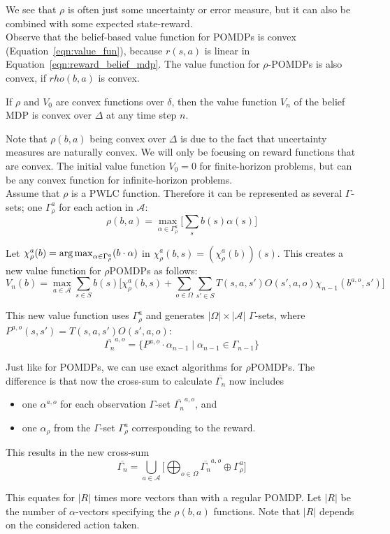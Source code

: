 We see that $\rho$ is often just some uncertainty or error measure, but it can also be combined with some expected state-reward.\\

Observe that the belief-based value function for POMDPs is convex (Equation~\ref{eqn:value_fun}), because $r(s,a)$ is linear in Equation~\ref{eqn:reward_belief_mdp}. The value function for $\rho$-POMDPs is also convex, if $rho(b,a)$ is convex.

\begin{theorem}
	If $\rho$ and $V_0$ are convex functions over $\delta$, then the value function $V_n$ of the belief MDP is convex over $\Delta$ at any time step $n$.
\end{theorem}

Note that $\rho(b,a)$ being convex over $\Delta$ is due to the fact that uncertainty measures are naturally convex\cite{p:belief-dependent-rewards}. We will only be focusing on reward functions that are convex. The initial value function $V_0=0$ for finite-horizon problems, but can be any convex function for infinite-horizon problems.\\

Assume that $\rho$ is a PWLC function. Therefore it can be represented as several $\Gamma$-sets; one $\Gamma^a_\rho$ for each action in $\mathcal{A}$:
\begin{equation}
	\rho(b,a)=\max_{\alpha\in\Gamma^a_\rho}\big[\sum_{s}b(s)\alpha(s)\big]
\end{equation}

Let $\chi_\rho^a(b)=\operatorname*{arg\,max}_{\alpha\in\Gamma^a_\rho}(b\cdot\alpha)$ in $\chi_\rho^a(b,s) = (\chi_\rho^a(b))(s)$. This creates a new value function for $\rho$POMDPs as follows:
\begin{equation}
	V_n(b)= \max_{a\in \mathcal{A}}\sum_{s\in S}b(s) \big[\chi_\rho^a(b,s) + \sum_{o\in \Omega}\sum_{s'\in S}T(s,a,s')O(s',a,o)\chi_{n-1}(b^{a,o},s') \big]
\end{equation}

This new value function uses $\Gamma_\rho^a$ and generates $|\Omega|\times|\mathcal{A}|$ $\Gamma$-sets, where $P^{a,o}(s,s')=T(s,a,s')O(s',a,o)$:
\begin{equation}
	\overline{\Gamma_n}^{a,o}=\{P^{a,o}\cdot\alpha_{n-1}\mid\alpha_{n-1}\in\Gamma_{n-1}\}
\end{equation}

Just like for POMDPs, we can use exact algorithms for $\rho$POMDPs. The difference is that now the cross-sum to calculate $\overline{\Gamma_n}$ now includes 
\begin{itemize}
	\item one $\alpha^{a,o}$ for each observation $\Gamma$-set $\overline{\Gamma_n}^{a,o}$, and
	\item one $\alpha_\rho$ from the $\Gamma$-set $\Gamma_\rho^a$ corresponding to the reward.
\end{itemize}
This results in the new cross-sum 
\begin{equation}
	\overline{\Gamma_n}=\bigcup_{a\in\mathcal{A}}\big[\bigoplus_{o\in \Omega}\overline{\Gamma_n}^{a,o}\oplus\Gamma_\rho^a\big]
\end{equation}

This equates for $|R|$ times more vectors than with a regular POMDP. Let $|R|$ be the number of $\alpha$-vectors specifying the $\rho(b,a)$ functions. Note that $|R|$ depends on the considered action taken. 